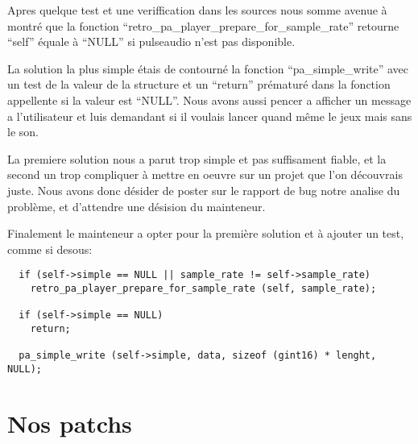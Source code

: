 \documentclass[12pt]{report}
\begin{document}
Apres quelque test et une veriffication dans les sources nous somme avenue à montré
que la fonction ``retro\_pa\_player\_prepare\_for\_sample\_rate'' retourne ``self''
équale à ``NULL'' si pulseaudio n'est pas disponible.

La solution la plus simple étais de contourné la fonction ``pa\_simple\_write''
avec un test de la valeur de la structure et un ``return'' prématuré dans la fonction
appellente si la valeur est ``NULL''. Nous avons aussi pencer a afficher un message a
l'utilisateur et luis demandant si il voulais lancer quand même le jeux mais sans le son.

La premiere solution nous a parut trop simple et pas suffisament fiable, et la
second un trop compliquer à mettre en oeuvre sur un projet que l'on découvrais juste.
Nous avons donc désider de poster sur le rapport de bug notre analise du problème, et
d'attendre une désision du mainteneur.

Finalement le mainteneur a opter pour la première solution et à ajouter un test, comme
si desous:
\begin{verbatim}
  if (self->simple == NULL || sample_rate != self->sample_rate)
    retro_pa_player_prepare_for_sample_rate (self, sample_rate);

  if (self->simple == NULL)
    return;

  pa_simple_write (self->simple, data, sizeof (gint16) * lenght, NULL);
\end{verbatim}

\section{Nos patchs}
\end{document}
